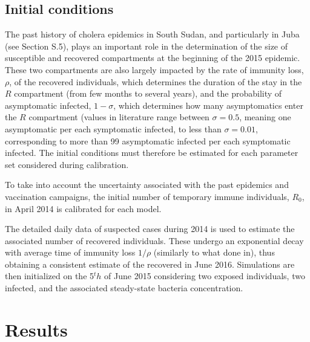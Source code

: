 \subsection{Initial conditions}
 The past history of cholera epidemics in South Sudan, and particularly in Juba (see Section S.5), plays an important role in the determination of the size of susceptible and recovered compartments at the beginning of the 2015 epidemic. These two compartments are also largely impacted by the rate of immunity loss, $\rho$, of the recovered individuals, which determines the duration of the stay in the $R$ compartment (from few months to several years), and the probability of asymptomatic infected, $1-\sigma$, which determines how many asymptomatics enter the $R$ compartment (values in literature range between $\sigma=0.5$, meaning one asymptomatic per each symptomatic infected, to less than $\sigma=0.01$, corresponding to more than 99 asymptomatic infected per each symptomatic infected\cite{Fung:CholeraTransmissionDynamic:2014}. The initial conditions must therefore be estimated for each parameter set considered during calibration.
 
 To take into account the uncertainty associated with the past epidemics and vaccination campaigns, the initial number of temporary immune individuals, $R_0$, in April 2014 is calibrated for each model.
 
 The detailed daily data of suspected cases during 2014 is used to estimate the associated number of recovered individuals. These undergo an exponential decay with average time of immunity loss $1/\rho$ (similarly to what done in\cite{Pasetto:RealtimeProjectionsCholera:2017}), thus obtaining a consistent estimate of the recovered in June 2016. Simulations are then initialized on the 5$^th$ of June 2015 considering two exposed individuals, two infected, and the associated steady-state bacteria concentration. 
 
\section{Results}

